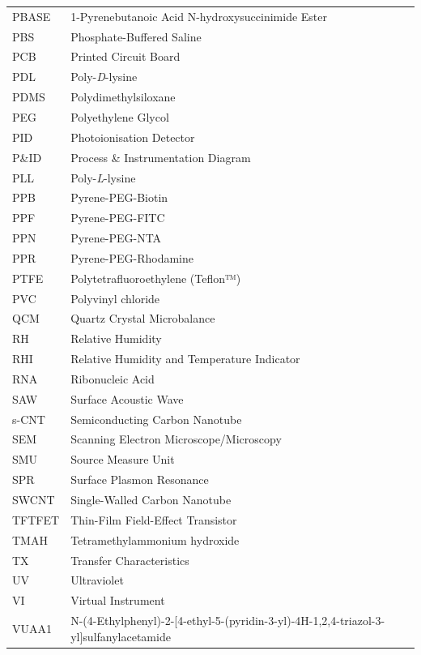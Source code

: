 \documentclass[
  a4paper,
]{scrbook}
\begin{document}
\newpage
\fancyhf{} %
\thispagestyle{fancy} %
\renewcommand{\headrulewidth}{0pt}
\fancyfoot[R]{\thepage} %
\begin{table}[H]
  \begin{tabular}{@{}p{} p{}@{}}  %
    PBASE  & 1-Pyrenebutanoic Acid N-hydroxysuccinimide Ester  \\[5pt]
    PBS  & Phosphate-Buffered Saline  \\[5pt]
    PCB  & Printed Circuit Board   \\[5pt]
    PDL & Poly-\textit{D}-lysine  \\[5pt]
    PDMS  & Polydimethylsiloxane   \\  [5pt]
    PEG  & Polyethylene Glycol  \\[5pt] 
    PID  & Photoionisation Detector  \\[5pt]
    P\&ID & Process \& Instrumentation Diagram  \\[5pt]
    PLL  & Poly-\textit{L}-lysine  \\[5pt]
    PPB  & Pyrene-PEG-Biotin  \\[5pt]
    PPF  & Pyrene-PEG-FITC  \\[5pt]
    PPN  & Pyrene-PEG-NTA  \\[5pt]
    PPR  & Pyrene-PEG-Rhodamine  \\[5pt]
    PTFE  & Polytetrafluoroethylene (Teflon™)  \\[5pt]
    PVC  & Polyvinyl chloride  \\[5pt]
    QCM  & Quartz Crystal Microbalance  \\[5pt]
    RH  & Relative Humidity  \\[5pt]
    RHI  & Relative Humidity and Temperature Indicator  \\[5pt] 
    RNA  & Ribonucleic Acid   \\[5pt]
    SAW  & Surface Acoustic Wave   \\[5pt]
    s-CNT  & Semiconducting Carbon Nanotube   \\[5pt]
    SEM  & Scanning Electron Microscope/Microscopy   \\[5pt]
    SMU  & Source Measure Unit   \\[5pt]
    SPR  & Surface Plasmon Resonance   \\[5pt]
    SWCNT  & Single-Walled Carbon Nanotube   \\[5pt]
    TFTFET  & Thin-Film Field-Effect Transistor  \\[5pt]
    TMAH  & Tetramethylammonium hydroxide  \\[5pt]
    TX  & Transfer Characteristics  \\[5pt]
    UV  & Ultraviolet  \\[5pt]
    VI  & Virtual Instrument  \\[5pt]
    VUAA1  & N-(4-Ethylphenyl)-2-{[4-ethyl-5-(pyridin-3-yl)-4H-1,2,4-triazol-3-yl]sulfanyl}acetamide  \\[5pt] 
  \end{tabular}
\end{table}
\end{document}
